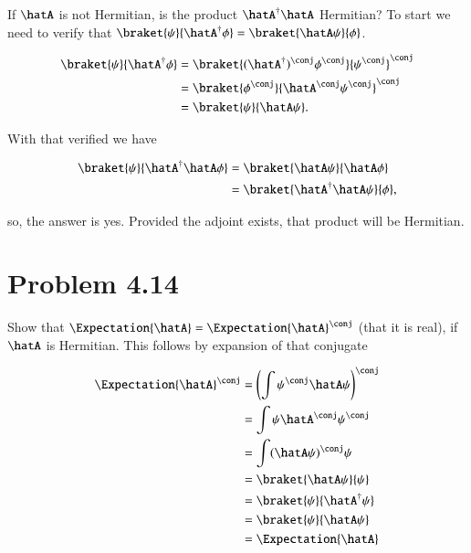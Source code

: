 If $\hatA$ is not Hermitian, is the product $\hatA^\dagger \hatA$ Hermitian?  To start we need to verify that $\braket{\psi}{\hatA^\dagger \phi} = \braket{\hatA \psi}{\phi}$.

\begin{align*}
\braket{ \psi }{ \hatA^\dagger \phi } 
&=
{\braket{ (\hatA^\dagger)^\conj \phi^\conj }{ \psi^\conj }}^\conj \\
&=
{\braket{ \phi^\conj }{ \hatA^\conj \psi^\conj }}^\conj \\
&=
\braket{ \psi }{ \hatA \psi }.
\end{align*}

With that verified we have

\begin{align*}
\braket{ \psi }{ \hatA^\dagger \hatA \phi } 
&=
\braket{ \hatA \psi }{ \hatA \phi }  \\
&=
\braket{ \hatA^\dagger \hatA \psi }{ \phi },
\end{align*}

so, the answer is yes.  Provided the adjoint exists, that product will be Hermitian.

\section{Problem 4.14}

Show that $\Expectation{\hatA} = \Expectation{\hatA}^\conj$ (that it is real), if $\hatA$ is Hermitian.  This follows by expansion of that conjugate

\begin{align*}
\Expectation{\hatA}^\conj 
&= \left(\int \psi^\conj \hatA \psi \right)^\conj \\
&= \int \psi \hatA^\conj \psi^\conj \\
&= \int (\hatA \psi)^\conj \psi \\
&= \braket{ \hatA \psi }{ \psi } \\
&= \braket{ \psi }{ \hatA^\dagger \psi } \\
&= \braket{ \psi }{ \hatA \psi } \\
&= \Expectation{\hatA}
\end{align*}

\EndArticle

